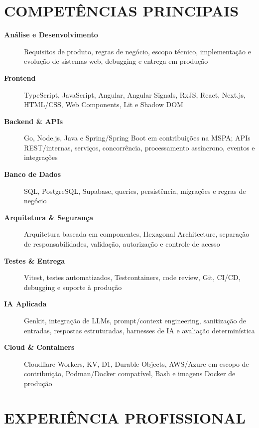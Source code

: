 \documentclass[10pt,a4paper]{article}
\begin{document}
\section*{COMPETÊNCIAS PRINCIPAIS}

\footnotesize

\begin{description}
    \item[\textbf{Análise e Desenvolvimento}]
    Requisitos de produto, regras de negócio, escopo técnico, implementação e evolução de sistemas web, debugging e entrega em produção

    \item[\textbf{Frontend}]
    TypeScript, JavaScript, Angular, Angular Signals, RxJS, React, Next.js, HTML/CSS, Web Components, Lit e Shadow DOM

    \item[\textbf{Backend \& APIs}]
    Go, Node.js, Java e Spring/Spring Boot em contribuições na MSPA; APIs REST/internas, serviços, concorrência, processamento assíncrono, eventos e integrações

    \item[\textbf{Banco de Dados}]
    SQL, PostgreSQL, Supabase, queries, persistência, migrações e regras de negócio

    \item[\textbf{Arquitetura \& Segurança}]
    Arquitetura baseada em componentes, Hexagonal Architecture, separação de responsabilidades, validação, autorização e controle de acesso

    \item[\textbf{Testes \& Entrega}]
    Vitest, testes automatizados, Testcontainers, code review, Git, CI/CD, debugging e suporte à produção

    \item[\textbf{IA Aplicada}]
    Genkit, integração de LLMs, prompt/context engineering, sanitização de entradas, respostas estruturadas, harnesses de IA e avaliação determinística

    \item[\textbf{Cloud \& Containers}]
    Cloudflare Workers, KV, D1, Durable Objects, AWS/Azure em escopo de contribuição, Podman/Docker compatível, Bash e imagens Docker de produção
\end{description}


\section*{EXPERIÊNCIA PROFISSIONAL}
\end{document}
